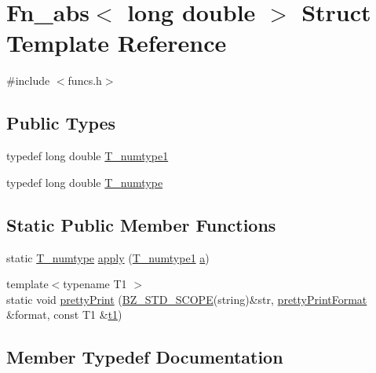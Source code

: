 \hypertarget{structFn__abs_3_01long_01double_01_4}{}\section{Fn\+\_\+abs$<$ long double $>$ Struct Template Reference}
\label{structFn__abs_3_01long_01double_01_4}


{\ttfamily \#include $<$funcs.\+h$>$}

\subsection*{Public Types}
\begin{DoxyCompactItemize}
\item 
typedef long double \hyperlink{structFn__abs_3_01long_01double_01_4_ab8cbf17733a7a96e26a9c1bf602af064}{T\+\_\+numtype1}
\item 
typedef long double \hyperlink{structFn__abs_3_01long_01double_01_4_a85966827265b70eec16d2072cd415949}{T\+\_\+numtype}
\end{DoxyCompactItemize}
\subsection*{Static Public Member Functions}
\begin{DoxyCompactItemize}
\item 
static \hyperlink{structFn__abs_3_01long_01double_01_4_a85966827265b70eec16d2072cd415949}{T\+\_\+numtype} \hyperlink{structFn__abs_3_01long_01double_01_4_a68c2b3cea814c4dd6c459e6697ed9e6b}{apply} (\hyperlink{structFn__abs_3_01long_01double_01_4_ab8cbf17733a7a96e26a9c1bf602af064}{T\+\_\+numtype1} \hyperlink{gen__mat5files_8m_aae328bf20413f220e38aec4d95bfd6da}{a})
\item 
{\footnotesize template$<$typename T1 $>$ }\\static void \hyperlink{structFn__abs_3_01long_01double_01_4_a72f2daee8d2bb026804a7e1b1d3932a2}{pretty\+Print} (\hyperlink{numinquire_8h_a2b24ffc3b4ef9803956bc7715c6c7b83}{B\+Z\+\_\+\+S\+T\+D\+\_\+\+S\+C\+O\+P\+E}(string)\&str, \hyperlink{classprettyPrintFormat}{pretty\+Print\+Format} \&format, const T1 \&\hyperlink{sparse_2linalg_2eigen_2arpack_2ARPACK_2SRC_2stat_8h_af377a4e2b03dbeb6590856bdfca3df30}{t1})
\end{DoxyCompactItemize}


\subsection{Member Typedef Documentation}
\hypertarget{structFn__abs_3_01long_01double_01_4_a85966827265b70eec16d2072cd415949}{}
